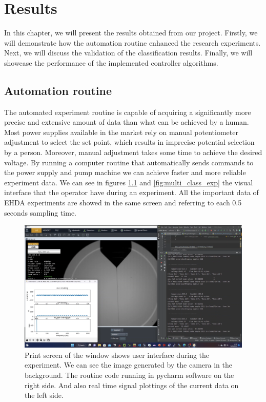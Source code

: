 \chapter{Results}
\label{chap:Results}

In this chapter, we will present the results obtained from our project. Firstly, we will demonstrate how the automation routine enhanced the research experiments. Next, we will discuss the validation of the classification results. Finally, we will showcase the performance of the implemented controller algorithms.

\section{Automation routine}
\label{sec:automation_routine}

The automated experiment routine is capable of acquiring a significantly more precise and extensive amount of data than what can be achieved by a human. Most power supplies available in the market rely on manual potentiometer adjustment to select the set point, which results in imprecise potential selection by a person. Moreover, manual adjustment takes some time to achieve the desired voltage. By running a computer routine that automatically sends commands to the power supply and pump machine we can achieve faster and more reliable experiment data.
We can see in figures \ref{fig:multi_class_exp1} and \ref{fig:multi_class_exp} the visual interface that the operator have during an experiment. All the important data of EHDA experiments are showed in the same screen and referring to each 0.5 seconds sampling time.

\begin{figure}[H]
    \center
    \includegraphics[width=16cm]{Figuras/19:03/axs1.png}
    \caption{Print screen of the window shows user interface during the experiment.
        We can see the image generated by the camera in the background.
        The routine code running in pycharm software on the right side.
        And also real time signal plottings of the current data on the left side.}
        \label{fig:multi_class_exp1}
\end{figure}


